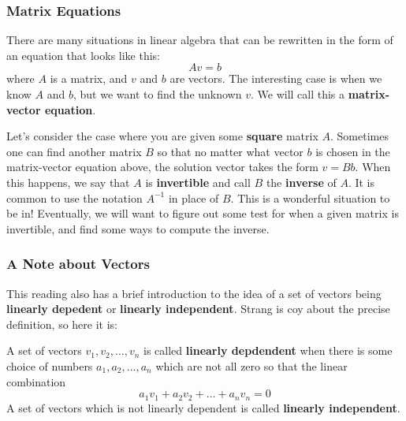 \documentclass[10pt,]{book}
\newcommand{\terminology}[1]{\textbf{#1}}
\theoremstyle{plain}
\numberwithin{equation}{section}
\begin{document}
\subsubsection[Matrix Equations]{Matrix Equations}\label{subsubsection-5}

        There are many situations in linear algebra that can be rewritten in
        the form of an equation that looks like this:\[
          A v = b
        \]
        where \(A\) is a matrix, and \(v\) and \(b\) are vectors. The
        interesting case is when we know \(A\) and \(b\), but we want to
        find the unknown \(v\). We will call this a
        \terminology{matrix-vector equation}.
\par

        Let's consider the case where you are given some \terminology{square}
        matrix \(A\). Sometimes one can find another matrix \(B\) so that
        no matter what vector \(b\) is chosen in the matrix-vector equation
        above, the  solution vector takes the form \(v = Bb\). When this
        happens, we say that \(A\) is \terminology{invertible} and call \(B\)
        the \terminology{inverse} of \(A\). It is common to use the notation
        \(A^{-1}\) in place of \(B\). This is a wonderful situation to be
        in! Eventually, we will want to figure out some test for when a given
        matrix is invertible, and find some ways to compute the inverse.
\typeout{************************************************}
\typeout{************************************************}
\subsubsection[A Note about Vectors]{A Note about Vectors}\label{subsubsection-6}

        This reading also has a brief introduction to the idea of a set of
        vectors being \terminology{linearly depedent} or \terminology{linearly independent}.
        Strang is coy about the precise definition, so here it is:
\par

        A set of vectors \(v_1, v_2, \dots, v_n\) is called \terminology{linearly
        depdendent} when there is some choice of numbers
        \(a_1, a_2, \dots, a_n\) which are not all zero so that the
        linear combination\[
          a_1 v_1 + a_2 v_2 + \dots + a_n v_n = 0
        \]
        A set of vectors which is not linearly dependent is called
        \terminology{linearly independent}.
\par
\end{document}
